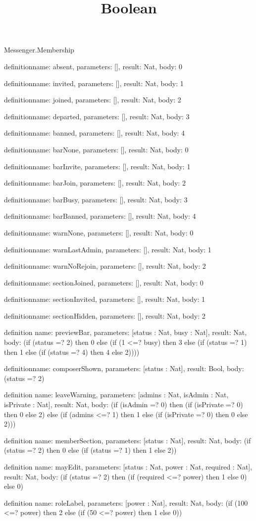 \begin{lexlean}{Messenger.Membership}
\title{Boolean}
\begin{semanticmodule}
definition{name: absent, parameters: [], result: Nat, body: 0}

definition{name: invited, parameters: [], result: Nat, body: 1}

definition{name: joined, parameters: [], result: Nat, body: 2}

definition{name: departed, parameters: [], result: Nat, body: 3}

definition{name: banned, parameters: [], result: Nat, body: 4}

definition{name: barNone, parameters: [], result: Nat, body: 0}

definition{name: barInvite, parameters: [], result: Nat, body: 1}

definition{name: barJoin, parameters: [], result: Nat, body: 2}

definition{name: barBusy, parameters: [], result: Nat, body: 3}

definition{name: barBanned, parameters: [], result: Nat, body: 4}

definition{name: warnNone, parameters: [], result: Nat, body: 0}

definition{name: warnLastAdmin, parameters: [], result: Nat, body: 1}

definition{name: warnNoRejoin, parameters: [], result: Nat, body: 2}

definition{name: sectionJoined, parameters: [], result: Nat, body: 0}

definition{name: sectionInvited, parameters: [], result: Nat, body: 1}

definition{name: sectionHidden, parameters: [], result: Nat, body: 2}

definition{
  name: previewBar,
  parameters: [status : Nat, busy : Nat],
  result: Nat,
  body: (if (status =? 2) then 0 else (if (1 <=? busy) then 3 else (if (status =? 1) then 1 else (if (status =? 4) then 4 else 2))))
}

definition{name: composerShown, parameters: [status : Nat], result: Bool, body: (status =? 2)}

definition{
  name: leaveWarning,
  parameters: [admins : Nat, isAdmin : Nat, isPrivate : Nat],
  result: Nat,
  body: (if (isAdmin =? 0) then (if (isPrivate =? 0) then 0 else 2) else (if (admins <=? 1) then 1 else (if (isPrivate =? 0) then 0 else 2)))
}

definition{
  name: memberSection,
  parameters: [status : Nat],
  result: Nat,
  body: (if (status =? 2) then 0 else (if (status =? 1) then 1 else 2))
}

definition{
  name: mayEdit,
  parameters: [status : Nat, power : Nat, required : Nat],
  result: Nat,
  body: (if (status =? 2) then (if (required <=? power) then 1 else 0) else 0)
}

definition{
  name: roleLabel,
  parameters: [power : Nat],
  result: Nat,
  body: (if (100 <=? power) then 2 else (if (50 <=? power) then 1 else 0))
}
\end{semanticmodule}
\end{lexlean}
